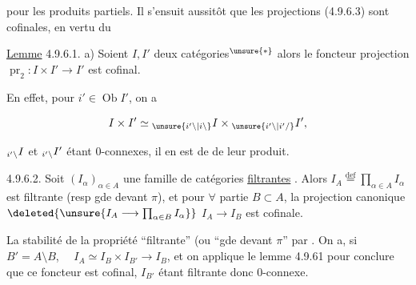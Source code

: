 
pour les produits partiels. Il s'ensuit aussitôt que les projections (4.9.6.3) sont cofinales, en vertu du

\uline{Lemme} 4.9.6.1. a) Soient $I,I'$ deux catégories$\vphantom{x}^{\unsure{\ast}}$   alors le foncteur projection $\operatorname{pr}_2:I\times I'\longrightarrow I'$ est cofinal.


 En effet, pour $i'\in\operatorname{Ob}I'$, on a

\[
I\times I'\simeq {}_{\unsure{i'\backslash|i\backslash}}I\times{}_{\unsure{i'\backslash|i'/}}I',
\]

$\vphantom{I}_{i'\backslash}I$ et $\vphantom{I}_{i'\backslash}I'$ étant 0-connexes, il en est de  de leur produit.



\uline{} 4.9.6.2. Soit $(I_\alpha)_{\alpha\in A}$ une famille de catégories \uline{filtrantes} . Alors  $I_A\overset{\mathrm{def}}{=}\prod_{\alpha\in A}I_\alpha$ est filtrante (resp gde devant $\pi$), et pour $\forall$ partie $B\subset A$, la projection canonique $\deleted{\unsure{I_A\longrightarrow\prod_{\alpha\in B}I_\alpha}}$ $I_A\longrightarrow I_B$ est cofinale.


La stabilité de la propriété ``filtrante'' (ou ``gde devant $\pi$'' par . On a, si $B'=A\setminus B$, $\quad I_A\simeq I_B\times I_{B'}\longrightarrow I_B$, et on applique le lemme 4.9.61 pour conclure que ce foncteur est cofinal, $I_{B'}$ étant filtrante donc 0-connexe.
